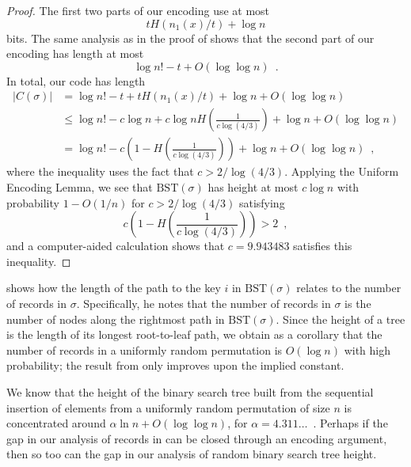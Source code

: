 \documentclass[format=acmsmall, review=false, screen=true]{acmart}
\begin{document}
\begin{proof}
  The first two parts of our encoding use at most
  \[
    t H(n_1(x)/t) + \log n
  \]
  bits. The same analysis as in the proof of  shows that
  the second part of our encoding has length at most
  \[
    \log n! - t + O(\log \log n) \enspace .
  \]
  In total, our code has length
  \begin{align*}
    |C(\sigma)| &= \log n! - t + t H(n_1(x)/t) + \log n + O(\log \log n) \\
                &\le \log n! - c \log n + c \log n H\left(\frac{1}{c \log (4/3)}\right) + \log n + O(\log \log n) \\
                &= \log n! - c \left(1 - H\left(\frac{1}{c \log (4/3)}\right)\right) + \log n + O(\log \log n) \enspace ,
  \end{align*}
  where the inequality uses the fact that $c > 2/\log(4/3)$. Applying
  the Uniform Encoding Lemma, we see that $\text{BST}(\sigma)$ has
  height at most $c \log n$ with probability $1 - O(1/n)$ for
  $c > 2/\log (4/3)$ satisfying
  \[
    c \left(1 - H\left(\frac{1}{c \log (4/3)}\right)\right) > 2 \enspace ,
  \]
  and a computer-aided calculation shows that 
  $c = 9.943483$ 
  satisfies this inequality.
\end{proof}

\begin{rem}
   shows how the length of the path to
  the key $i$ in $\text{BST}(\sigma)$ relates to the number of records
  in $\sigma$. Specifically, he notes that the number of records in
  $\sigma$ is the number of nodes along the rightmost path in
  $\text{BST}(\sigma)$. Since the height of a tree is the length of
  its longest root-to-leaf path, we obtain as a corollary that the
  number of records in a uniformly random permutation is $O(\log n)$
  with high probability; the result from  only
  improves upon the implied constant.
\end{rem}

\begin{rem}
  We know that the height of the binary search tree built from the
  sequential insertion of elements from a uniformly random permutation
  of size $n$ is concentrated around $\alpha \ln n + O(\log \log n)$,
  for $\alpha = 4.311\dots$~\cite{reed:height}. Perhaps if the gap in
  our analysis of records in  can be closed through an
  encoding argument, then so too can the gap in our analysis of random
  binary search tree height.
\end{rem}
\end{document}
